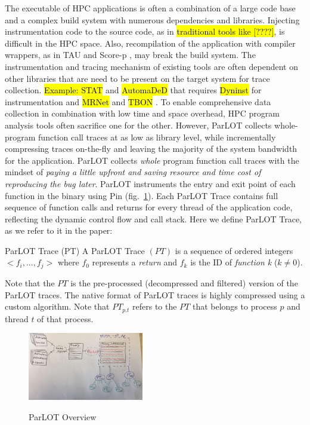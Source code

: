 The executable of HPC applications is often a combination of a large code base and a complex build system with numerous dependencies and libraries. Injecting instrumentation code to the source code, as in \hl{traditional tools like [????]}, is difficult in the HPC space. Also, recompilation of the application with compiler wrappers, as in TAU \cite{tau} and Score-p \cite{scorep}, may break the build system.
The instrumentation and tracing mechanism of existing tools are often dependent on other libraries that are need to be present on the target system for trace collection. \hl{Example: STAT} \cite{stat} and \hl{AutomaDeD} \cite{automaded-laguna} that requires \hl{Dyninst} \cite{dyninst} for instrumentation and \hl{MRNet} \cite{mrnet} and \hl{ TBON} \cite{tbon}.
%
To enable comprehensive data collection in combination with low time and space overhead, HPC program analysis tools often sacrifice one for the other. However, ParLOT collects whole-program function call traces at as low as library level, while incrementally compressing traces on-the-fly and leaving the majority of the system bandwidth for the application.
%
ParLOT collects \textit{whole} program function call traces with the mindset of \textit{paying a little upfront and saving resource and time cost of reproducing the bug later}.
%
ParLOT instruments the entry and exit point of each function in the binary using Pin \cite{pin} (fig.~\ref{fig.parlotOverview}). Each ParLOT Trace contains full sequence of function calls and returns for every thread of the application code, reflecting the dynamic control flow and call stack.
%
Here we define ParLOT Trace, as we refer to it in the paper:

\begin{definition}{ParLOT Trace (PT)}
A ParLOT Trace $(PT)$ is a sequence of ordered integers $<f_i,...,f_j>$ where $f_0$ represents a \textit{return} and $f_k$ is the ID of \textit{function k} ($k \neq 0$).
\end{definition}
%
Note that the $PT$ is the pre-processed (decompressed and filtered) version of the ParLOT traces. The native format of ParLOT traces is highly compressed using a custom algorithm.
%
Note that $PT_{p.t}$ refers to the $PT$ that belongs to process $p$ and thread $t$ of that process.
%
\begin{figure}[t]
\caption{ParLOT Overview}
\includegraphics[width=0.45\textwidth]{figs/parlotOverview.jpg}
\label{fig.parlotOverview}
\end{figure}

